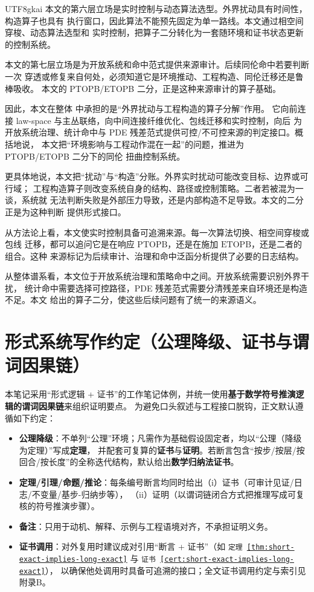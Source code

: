 \documentclass[12pt]{article}
\newcommand{\GFramework}{\text{G-Framework}}
\newcommand{\PTOPB}{\ensuremath{\mathrm{PTOPB}}}
\newcommand{\ETOPB}{\ensuremath{\mathrm{ETOPB}}}
\begin{document}
\begin{CJK*}{UTF8}{gkai}
本文的第六层立场是实时控制与动态算法选型。外界扰动具有时间性，构造算子也具有
执行窗口，因此算法不能预先固定为单一路线。本文通过相空间穿梭、动态算法选型和
实时控制，把算子二分转化为一套随环境和证书状态更新的控制系统。

本文的第七层立场是为开放系统和命中范式提供来源审计。后续同伦命中若要判断一次
穿透或修复来自何处，必须知道它是环境推动、工程构造、同伦迁移还是鲁棒吸收。
本文的 PTOPB/ETOPB 二分，正是这种来源审计的算子基础。

因此，本文在整体 \GFramework{} 中承担的是“外界扰动与工程构造的算子分解”作用。
它向前连接 law-space 与主丛联络，向中间连接纤维优化、包线迁移和实时控制，向后
为开放系统治理、统计命中与 PDE 残差范式提供可控/不可控来源的判定接口。概括地说，
本文把“环境影响与工程动作混在一起”的问题，推进为 PTOPB/ETOPB 二分下的同伦
扭曲控制系统。

更具体地说，本文把“扰动”与“构造”分账。外界实时扰动可能改变目标、边界或可行域；
工程构造算子则改变系统自身的结构、路径或控制策略。二者若被混为一谈，系统就
无法判断失败是外部压力导致，还是内部构造不足导致。本文的二分正是为这种判断
提供形式接口。

从方法论上看，本文使实时控制具备可追溯来源。每一次算法切换、相空间穿梭或包线
迁移，都可以追问它是在响应 \PTOPB{}，还是在施加 \ETOPB{}，还是二者的组合。这种
来源标记为后续审计、治理和命中泛函分析提供了必要的日志结构。

从整体谱系看，本文位于开放系统治理和策略命中之间。开放系统需要识别外界干扰，
统计命中需要选择可控路径，PDE 残差范式需要分清残差来自环境还是构造不足。本文
给出的算子二分，使这些后续问题有了统一的来源语义。

\setcounter{tocdepth}{2}
\setcounter{secnumdepth}{2}
\tableofcontents
\clearpage

\section*{形式系统写作约定（公理降级、证书与谓词因果链）}
本笔记采用“形式逻辑 + 证书”的工作笔记体例，并统一使用\textbf{基于数学符号推演逻辑的谓词因果链}来组织证明要点。
为避免口头叙述与工程接口脱钩，正文默认遵循如下约定：
\begin{itemize}
  \item \textbf{公理降级}：不单列“公理”环境；凡需作为基础假设固定者，均以“公理（降级为定理）”写成\textbf{定理}，
  并配套可复算的\textbf{证书}与\textbf{证明}。若断言包含“按步/按层/按回合/按长度”的全称迭代结构，默认给出\textbf{数学归纳法证书}。
  \item \textbf{定理/引理/命题/推论}：每条编号断言均同时给出（i）证书（可审计见证/日志/不变量/基步-归纳步等），
  （ii）证明（以谓词链闭合方式把推理写成可复核的符号推演步骤）。
  \item \textbf{备注}：只用于动机、解释、示例与工程语境对齐，不承担证明义务。
  \item \textbf{证书调用}：对外复用时建议成对引用“断言 + 证书”（如 \texttt{定理~\ref{thm:short-exact-implies-long-exact}} 与 \texttt{证书~\ref{cert:short-exact-implies-long-exact}}），
  以确保他处调用时具备可追溯的接口；全文证书调用约定与索引见附录B。
\end{itemize}
\clearpage


\end{CJK*}
\end{document}
